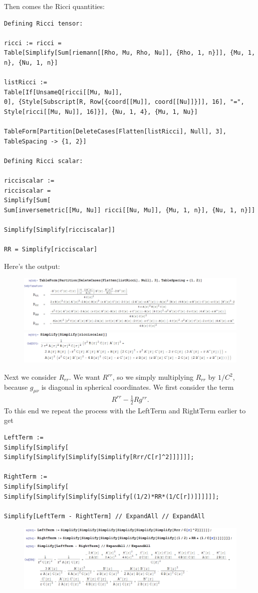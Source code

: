 \documentclass{book}
\theoremstyle{definition}
\newcommand{\f}[2]{\frac{#1}{#2}}
\begin{document}
Then comes the Ricci quantities:
\begin{lstlisting}
Defining Ricci tensor:

ricci := ricci = 
Table[Simplify[Sum[riemann[[Rho, Mu, Rho, Nu]], {Rho, 1, n}]], {Mu, 1, 
n}, {Nu, 1, n}]

listRicci := 
Table[If[UnsameQ[ricci[[Mu, Nu]], 
0], {Style[Subscript[R, Row[{coord[[Mu]], coord[[Nu]]}]], 16], "=", 
Style[ricci[[Mu, Nu]], 16]}], {Nu, 1, 4}, {Mu, 1, Nu}]

TableForm[Partition[DeleteCases[Flatten[listRicci], Null], 3], 
TableSpacing -> {1, 2}]

Defining Ricci scalar:

ricciscalar := 
ricciscalar = 
Simplify[Sum[
Sum[inversemetric[[Mu, Nu]] ricci[[Nu, Mu]], {Mu, 1, n}], {Nu, 1, n}]]

Simplify[Simplify[ricciscalar]]

RR = Simplify[ricciscalar]
\end{lstlisting}

Here's the output:
\begin{figure}[!htb]
	\centering
	\includegraphics[scale=0.4]{sphericalricci}
	\includegraphics[scale=0.4]{sphericalricciscalar}
\end{figure}


Next we consider $R_{rr}$. We want $R^{rr}$, so we simply multiplying $R_{rr}$ by $1/C^2$, because $g_{\mu\nu}$ is diagonal in spherical coordinates. We first consider the term
\begin{align}
R^{rr} - \f{1}{2}Rg^{rr}.
\end{align}
To this end we repeat the process with the LeftTerm and RightTerm earlier to get
\begin{lstlisting}
LeftTerm := 
Simplify[Simplify[
Simplify[Simplify[Simplify[Simplify[Rrr/C[r]^2]]]]]];

RightTerm := 
Simplify[Simplify[
Simplify[Simplify[Simplify[Simplify[(1/2)*RR*(1/C[r])]]]]]];

Simplify[LeftTerm - RightTerm] // ExpandAll // ExpandAll
\end{lstlisting}
\begin{figure}[!htb]
	\centering
	\includegraphics[scale=0.4]{sphericalleftright}
\end{figure}
\end{document}
